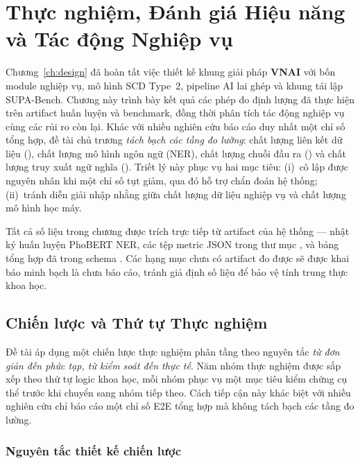 \chapter{Thực nghiệm, Đánh giá Hiệu năng và Tác động Nghiệp vụ}
\label{ch:experiments}

Chương~\ref{ch:design} đã hoàn tất việc thiết kế khung giải pháp \textbf{VNAI} với bốn module nghiệp vụ, mô hình SCD Type~2, pipeline AI lai ghép và khung tái lập SUPA-Bench. Chương này trình bày kết quả các phép đo định lượng đã thực hiện trên artifact huấn luyện và benchmark, đồng thời phân tích tác động nghiệp vụ cùng các rủi ro còn lại. Khác với nhiều nghiên cứu báo cáo duy nhất một chỉ số tổng hợp, đề tài chủ trương \emph{tách bạch các tầng đo lường}: chất lượng liên kết dữ liệu (), chất lượng mô hình ngôn ngữ (NER), chất lượng chuỗi đầu ra () và chất lượng truy xuất ngữ nghĩa (). Triết lý này phục vụ hai mục tiêu: (i)~cô lập được nguyên nhân khi một chỉ số tụt giảm, qua đó hỗ trợ chẩn đoán hệ thống; (ii)~tránh diễn giải nhập nhằng giữa chất lượng dữ liệu nghiệp vụ và chất lượng mô hình học máy.

Tất cả số liệu trong chương được trích trực tiếp từ artifact của hệ thống --- nhật ký huấn luyện PhoBERT NER, các tệp metric JSON trong thư mục , và bảng tổng hợp đã  trong schema . Các hạng mục chưa có artifact đo được sẽ được khai báo minh bạch là chưa báo cáo, tránh giả định số liệu để bảo vệ tính trung thực khoa học.

\section{Chiến lược và Thứ tự Thực nghiệm}
\label{sec:exp-strategy}

Đề tài áp dụng một chiến lược thực nghiệm phân tầng theo nguyên tắc \emph{từ đơn giản đến phức tạp, từ kiểm soát đến thực tế}. Năm nhóm thực nghiệm được sắp xếp theo thứ tự logic khoa học, mỗi nhóm phục vụ một mục tiêu kiểm chứng cụ thể trước khi chuyển sang nhóm tiếp theo. Cách tiếp cận này khác biệt với nhiều nghiên cứu chỉ báo cáo một chỉ số E2E tổng hợp mà không tách bạch các tầng đo lường.

\subsection{Nguyên tắc thiết kế chiến lược}
\label{sec:exp-strategy-principle}

